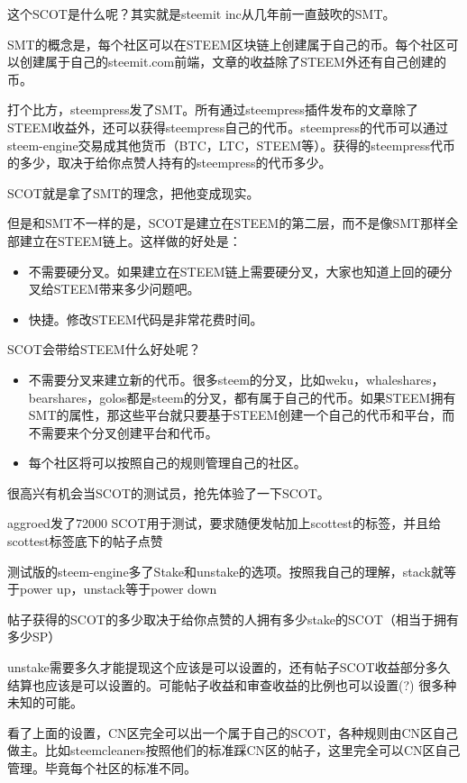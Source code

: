 \documentclass[]{ctexbook}
\providecommand{\tightlist}{%
  \setlength{\itemsep}{0pt}\setlength{\parskip}{0pt}}
\begin{document}
这个SCOT是什么呢？其实就是steemit inc从几年前一直鼓吹的SMT。

SMT的概念是，每个社区可以在STEEM区块链上创建属于自己的币。每个社区可以创建属于自己的steemit.com前端，文章的收益除了STEEM外还有自己创建的币。

打个比方，steempress发了SMT。所有通过steempress插件发布的文章除了STEEM收益外，还可以获得steempress自己的代币。steempress的代币可以通过steem-engine交易成其他货币（BTC，LTC，STEEM等）。获得的steempress代币的多少，取决于给你点赞人持有的steempress的代币多少。

SCOT就是拿了SMT的理念，把他变成现实。

但是和SMT不一样的是，SCOT是建立在STEEM的第二层，而不是像SMT那样全部建立在STEEM链上。这样做的好处是：

\begin{itemize}
\tightlist
\item
  不需要硬分叉。如果建立在STEEM链上需要硬分叉，大家也知道上回的硬分叉给STEEM带来多少问题吧。
\item
  快捷。修改STEEM代码是非常花费时间。
\end{itemize}

SCOT会带给STEEM什么好处呢？

\begin{itemize}
\tightlist
\item
  不需要分叉来建立新的代币。很多steem的分叉，比如weku，whaleshares，bearshares，golos都是steem的分叉，都有属于自己的代币。如果STEEM拥有SMT的属性，那这些平台就只要基于STEEM创建一个自己的代币和平台，而不需要来个分叉创建平台和代币。
\item
  每个社区将可以按照自己的规则管理自己的社区。
\end{itemize}

很高兴有机会当SCOT的测试员，抢先体验了一下SCOT。

aggroed发了72000 SCOT用于测试，要求随便发帖加上scottest的标签，并且给scottest标签底下的帖子点赞

测试版的steem-engine多了Stake和unstake的选项。按照我自己的理解，stack就等于power up，unstack等于power down

帖子获得的SCOT的多少取决于给你点赞的人拥有多少stake的SCOT（相当于拥有多少SP）

unstake需要多久才能提现这个应该是可以设置的，还有帖子SCOT收益部分多久结算也应该是可以设置的。可能帖子收益和审查收益的比例也可以设置(?) 很多种未知的可能。

看了上面的设置，CN区完全可以出一个属于自己的SCOT，各种规则由CN区自己做主。比如steemcleaners按照他们的标准踩CN区的帖子，这里完全可以CN区自己管理。毕竟每个社区的标准不同。
\end{document}

